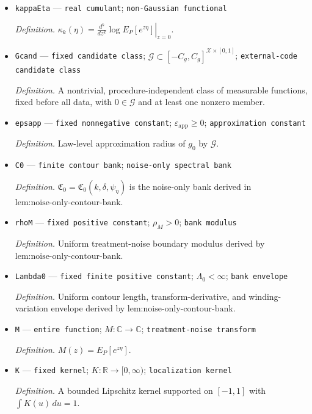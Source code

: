 \documentclass{article}
\begin{document}
\begin{itemize}
  \item \texttt{kappaEta} --- \texttt{real cumulant}; \texttt{non-\allowbreak{}Gaussian functional}
  \par\smallskip\noindent\emph{Definition.} \(\kappa_k(\eta)=\left.\frac{d^k}{dz^k}\log E_P[e^{z\eta}]\right|_{z=0}\).
  \item \texttt{Gcand} --- \texttt{fixed candidate class}; \(\mathcal G\subset[-C_g,C_g]^{\mathcal X\times[0,1]}\); \texttt{external-\allowbreak{}code candidate class}
  \par\smallskip\noindent\emph{Definition.} A nontrivial, procedure-independent class of measurable functions, fixed before all data, with \(0\in\mathcal G\) and at least one nonzero member.
  \item \texttt{epsapp} --- \texttt{fixed nonnegative constant}; \(\varepsilon_{\mathrm{app}}\ge0\); \texttt{approximation constant}
  \par\smallskip\noindent\emph{Definition.} Law-level approximation radius of \(g_0\) by \(\mathcal G\).
  \item \texttt{C0} --- \texttt{finite contour bank}; \texttt{noise-\allowbreak{}only spectral bank}
  \par\smallskip\noindent\emph{Definition.} \(\mathfrak C_0=\mathfrak C_0(k,\delta,\psi_{\eta})\) is the noise-only bank derived in \(\text{lem:noise-only-contour-bank}\).
  \item \texttt{rhoM} --- \texttt{fixed positive constant}; \(\rho_M>0\); \texttt{bank modulus}
  \par\smallskip\noindent\emph{Definition.} Uniform treatment-noise boundary modulus derived by \(\text{lem:noise-only-contour-bank}\).
  \item \texttt{Lambda0} --- \texttt{fixed finite positive constant}; \(\Lambda_0<\infty\); \texttt{bank envelope}
  \par\smallskip\noindent\emph{Definition.} Uniform contour length, transform-derivative, and winding-variation envelope derived by \(\text{lem:noise-only-contour-bank}\).
  \item \texttt{M} --- \texttt{entire function}; \(M:\mathbb C\to\mathbb C\); \texttt{treatment-\allowbreak{}noise transform}
  \par\smallskip\noindent\emph{Definition.} \(M(z)=E_P[e^{z\eta}]\).
  \item \texttt{K} --- \texttt{fixed kernel}; \(K:\mathbb R\to[0,\infty)\); \texttt{localization kernel}
  \par\smallskip\noindent\emph{Definition.} A bounded Lipschitz kernel supported on \([-1,1]\) with \(\int K(u)\,du=1\).

\end{itemize}
\end{document}
